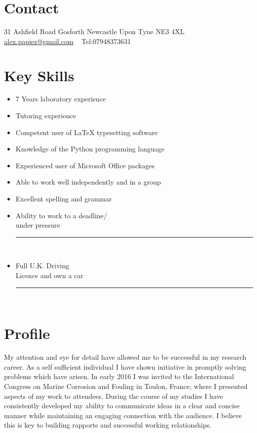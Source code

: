 \documentclass[]{friggeri-cv}
\begin{document}
       {%
       	}
       {}


\begin{aside}
 \vspace{-0.5cm}
  \section{Contact}
    31 Ashfield Road
    Gosforth
    Newcastle Upon Tyne
    NE3 4XL
    ~
    \href{mailto:alex.papiez@gmail.com}{alex.papiez@gmail.com}
    ~
    Tel:07948373631
    ~
  \section{Key Skills}
   \begin{itemize}
   \item 7 Years laboratory experience
   \item Tutoring experience
   \item Competent user of LaTeX typesetting software
   \item Knowledge of the Python programming language
   \item Experienced user of Microsoft Office packages
   \item Able to work well independently and in a group
   \item Excellent spelling and grammar
   \item Ability to work to a deadline/ \\ under pressure
   \rule[0.125cm]{0.6\textwidth}{0.4pt}\\
   \item Full U.K. Driving\\ Licence and own a car
   \rule[0.125cm]{0.6\textwidth}{0.4pt}
   \end{itemize}
   ~
   ~
\end{aside}
\vspace{-0.6cm}
\section{Profile}
My attention and eye for detail have allowed me to be successful in my research career. As a self sufficient individual I have shown initiative in promptly solving problems which have arisen. In early 2016 I was invited to the International Congress on Marine Corrosion and Fouling in Toulon, France; where I presented aspects of my work to attendees. During the course of my studies I have consistently developed my ability to communicate ideas in a clear and concise manner while maintaining an engaging connection with the audience. I believe this is key to building rapports and successful working relationships. 
\end{document}
